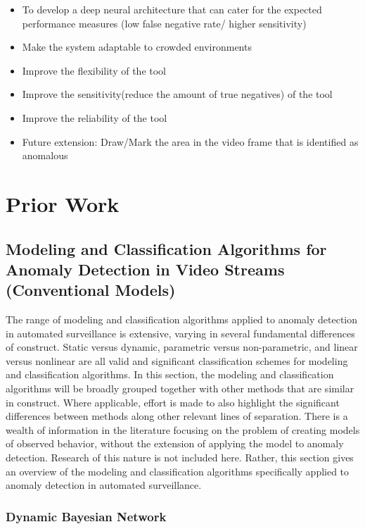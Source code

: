 \documentclass[a4paper,12pt]{report}
\begin{document}
\begin{itemize}
\begin{itemize}
    \item To develop a deep neural architecture that can cater for the expected performance measures (low false negative rate/ higher sensitivity)
    \item Make the system adaptable to crowded environments
    \item Improve the flexibility of the tool
    \item Improve the sensitivity(reduce the amount of true negatives) of the tool
    \item Improve the reliability of the tool 
    \item Future extension: Draw/Mark the area in the video frame that is identified as anomalous
\end{itemize}

\section{Prior Work}

\subsection{Modeling and Classification Algorithms
for Anomaly Detection in Video Streams (Conventional Models)
}
The range of modeling and classification algorithms applied to anomaly detection in automated surveillance is extensive, varying in several fundamental differences of construct. Static versus dynamic, parametric versus non-parametric, and linear versus nonlinear are all valid and significant classification schemes for modeling and classification algorithms. In this section, the modeling and classification algorithms will be broadly grouped together with other methods that are similar in construct. Where applicable, effort is made to also highlight the significant differences between methods along other relevant lines of separation.
There is a wealth of information in the literature focusing on the problem of creating models of observed behavior, without the extension of applying the model to anomaly detection. Research of this nature is not included here. Rather, this section gives an overview of the modeling and classification algorithms specifically applied to anomaly detection in automated surveillance.


\subsubsection{Dynamic Bayesian Network}


\end{itemize}
\end{document}
